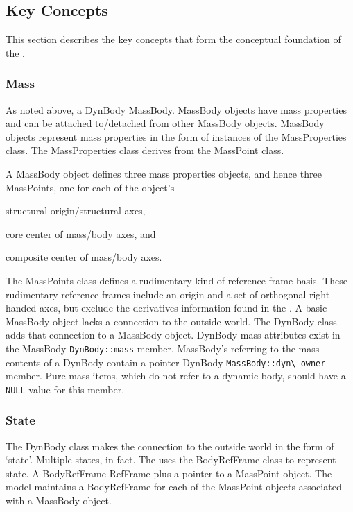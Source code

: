 \subsection{Key Concepts}\label{sec:key_concepts}
This section describes the key concepts that form the conceptual foundation of
the \ModelDesc.

\subsubsection{Mass}\label{sec:key_mass}
As noted above, a DynBody \hasa MassBody.
MassBody objects have mass properties and can be attached to/detached from
other MassBody objects. MassBody objects represent mass properties in the
form of instances of the MassProperties class.
The MassProperties class derives from the MassPoint class.

A MassBody object defines three mass properties objects, and hence three
MassPoints, one for each of the object's \begin{inparaenum}[(1)]
\item structural origin/structural axes,
\item core center of mass/body axes, and
\item composite center of mass/body axes.
\end{inparaenum}
The MassPoints class defines a rudimentary kind of reference frame basis. These
rudimentary reference frames include an origin and a set of orthogonal
right-handed axes, but exclude the derivatives information found in the
.
A basic MassBody object lacks a connection to the
outside world. The DynBody class adds that connection to a MassBody object. 
DynBody mass attributes exist in the MassBody \verb+DynBody::mass+  member.
MassBody's referring to the mass contents of a DynBody contain a pointer DynBody \verb+MassBody::dyn\_owner+ member. 
Pure mass items, which do not refer to a dynamic body, should have a \verb+NULL+ value for this member.

\subsubsection{State}
The DynBody class makes the connection to the outside world in the form of
`state'.  Multiple states, in fact. The \ModelDesc uses the BodyRefFrame
class to represent state. A BodyRefFrame \isa RefFrame plus a pointer
to a MassPoint object. The model maintains a BodyRefFrame for each of the
MassPoint objects associated with a MassBody object.

